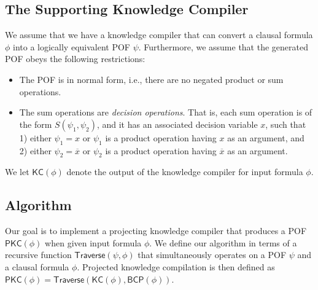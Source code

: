 \documentclass[letterpaper,USenglish,cleveref, autoref, thm-restate]{lipics-v2021}
\newcommand{\obar}[1]{\overline{#1}}
\newcommand{\algo}[1]{\textsf{#1}}
\newcommand{\kc}{\algo{KC}}
\newcommand{\pkc}{\algo{PKC}}
\newcommand{\traverse}{\algo{Traverse}}
\newcommand{\bcp}{\algo{BCP}}
\begin{document}
\subsection{The Supporting Knowledge Compiler}

We assume that we have a knowledge compiler that can convert a clausal formula $\phi$ into a logically equivalent POF $\psi$.  Furthermore, we assume that the generated POF obeys the following restrictions:
\begin{itemize}
\item The POF is in normal form, i.e., there are no negated product or sum operations.
\item The sum operations are \emph{decision operations}.  That is, each sum operation is of the form $S(\psi_1, \psi_2)$, and it has an associated decision variable $x$,
  such that 1) either $\psi_1 = x$ or $\psi_1$ is a product operation having $x$ as an argument, and 2)
either $\psi_2 = \obar{x}$ or $\psi_2$ is a product operation having $\obar{x}$ as an argument.
\end{itemize}
We let $\kc(\phi)$ denote the output of the knowledge compiler for input formula $\phi$.

\subsection{Algorithm}

Our goal is to implement a projecting knowledge compiler that produces a POF $\pkc(\phi)$ when given input formula $\phi$.
We define our algorithm in terms of a recursive function $\traverse(\psi, \phi)$ that simultaneously operates on a POF $\psi$ and a clausal formula $\phi$.  Projected knowledge compilation is then defined
as $\pkc(\phi) = \traverse(\kc(\phi), \bcp(\phi))$.
\end{document}
